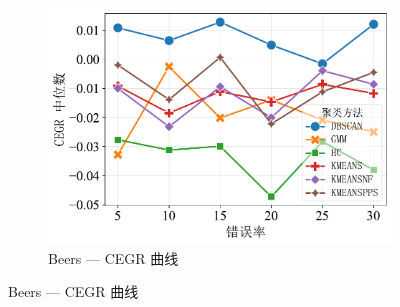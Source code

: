 \documentclass[10pt]{article} %
\numberwithin{equation}{section}
\begin{document}
\begin{figure}[htbp]
\begin{subfigure}[b]{0.33\linewidth}
    \includegraphics[width=\linewidth]{figures/6.4.3graph/CEGR_5pct_beers.pdf}
    \caption{Beers — CEGR 曲线}
    \label{fig:be_cegr}
  \end{subfigure}


\end{figure}
\end{document}
